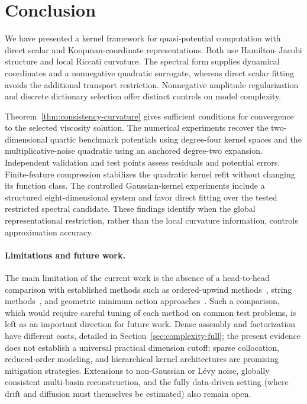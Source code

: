 \documentclass[11pt]{article}
\theoremstyle{plain}      %
\theoremstyle{definition} %
\begin{document}
\section{Conclusion}

We have presented a kernel framework for quasi-potential computation with direct scalar and Koopman-coordinate representations. Both use Hamilton--Jacobi structure and local Riccati curvature. The spectral form supplies dynamical coordinates and a nonnegative quadratic surrogate, whereas direct scalar fitting avoids the additional transport restriction. Nonnegative amplitude regularization and discrete dictionary selection offer distinct controls on model complexity.

Theorem~\ref{thm:consistency-curvature} gives sufficient conditions for convergence to the selected viscosity solution. The numerical experiments recover the two-dimensional quartic benchmark potentials using degree-four kernel spaces and the multiplicative-noise quadratic using an anchored degree-two expansion. Independent validation and test points assess residuals and potential errors. Finite-feature compression stabilizes the quadratic kernel refit without changing its function class. The controlled Gaussian-kernel experiments include a structured eight-dimensional system and favor direct fitting over the tested restricted spectral candidate. These findings identify when the global representational restriction, rather than the local curvature information, controls approximation accuracy.

\paragraph{Limitations and future work.}
The main limitation of the current work is the absence of a head-to-head comparison with established methods such as ordered-upwind methods~\cite{cameron2012finding, dahiya2018ordered}, string methods~\cite{heymann2008geometric, grafke2019numerical}, and geometric minimum action approaches~\cite{zhou2008adaptive}. Such a comparison, which would require careful tuning of each method on common test problems, is left as an important direction for future work.
Dense assembly and factorization have different costs, detailed in Section~\ref{sec:complexity-full}; the present evidence does not establish a universal practical dimension cutoff; sparse collocation, reduced-order modeling, and hierarchical kernel architectures are promising mitigation strategies. Extensions to non-Gaussian or Lévy noise, globally consistent multi-basin reconstruction, and the fully data-driven setting (where drift and diffusion must themselves be estimated) also remain open.
\end{document}
